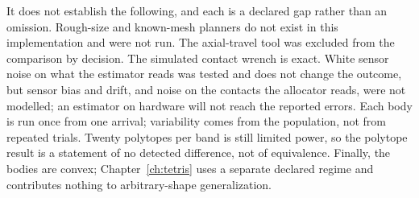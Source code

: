 It does not establish the following, and each is a declared gap rather than an omission. Rough-size and known-mesh planners do not exist in this implementation and were not run. The axial-travel tool was excluded from the comparison by decision. The simulated contact wrench is exact. White sensor noise on what the estimator reads was tested and does not change the outcome, but sensor bias and drift, and noise on the contacts the allocator reads, were not modelled; an estimator on hardware will not reach the reported errors. Each body is run once from one arrival; variability comes from the population, not from repeated trials. Twenty polytopes per band is still limited power, so the polytope result is a statement of no detected difference, not of equivalence. Finally, the bodies are convex; Chapter~\ref{ch:tetris} uses a separate declared regime and contributes nothing to arbitrary-shape generalization.
